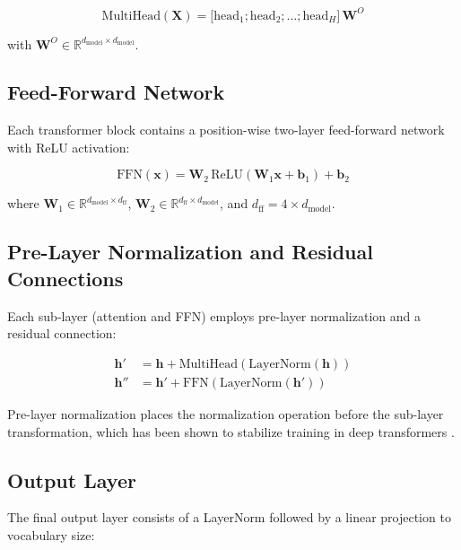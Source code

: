 \documentclass[conference]{IEEEtran}
\begin{document}
\begin{equation}
\text{MultiHead}(\mathbf{X}) = \big[\text{head}_1; \text{head}_2; \dots; \text{head}_H\big]\,\mathbf{W}^O
\end{equation}

with $\mathbf{W}^O \in \mathbb{R}^{d_{\text{model}} \times d_{\text{model}}}$.

\subsection{Feed-Forward Network}

Each transformer block contains a position-wise two-layer feed-forward network with ReLU activation:

\begin{equation}
\text{FFN}(\mathbf{x}) = \mathbf{W}_2 \, \text{ReLU}(\mathbf{W}_1 \mathbf{x} + \mathbf{b}_1) + \mathbf{b}_2
\end{equation}

where $\mathbf{W}_1 \in \mathbb{R}^{d_{\text{model}} \times d_{\text{ff}}}$, $\mathbf{W}_2 \in \mathbb{R}^{d_{\text{ff}} \times d_{\text{model}}}$, and $d_{\text{ff}} = 4 \times d_{\text{model}}$.

\subsection{Pre-Layer Normalization and Residual Connections}

Each sub-layer (attention and FFN) employs pre-layer normalization \cite{ba2016layer} and a residual connection:

\begin{align}
\mathbf{h}' &= \mathbf{h} + \text{MultiHead}(\text{LayerNorm}(\mathbf{h})) \\
\mathbf{h}'' &= \mathbf{h}' + \text{FFN}(\text{LayerNorm}(\mathbf{h}'))
\end{align}

Pre-layer normalization places the normalization operation before the sub-layer transformation, which has been shown to stabilize training in deep transformers \cite{xiong2020layer}.

\subsection{Output Layer}

The final output layer consists of a LayerNorm followed by a linear projection to vocabulary size:
\end{document}
